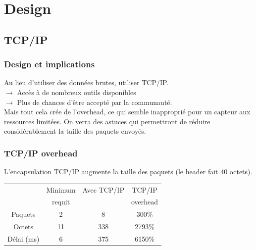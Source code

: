 \section{Design}
\subsection{TCP/IP}
\begin{frame}
 \frametitle{Design et implications}
 Au lieu d'utiliser des données brutes, utiliser TCP/IP.\\
 \vspace{5mm}
 \textbf{$\rightarrow$} Accès à de nombreux outils disponibles \\
 \textbf{$\rightarrow$} Plus de chances d'être accepté par la communauté.\\
 \vspace{5mm}
 Mais tout cela crée de l'overhead, ce qui semble inapproprié pour un capteur aux ressources limitées. On verra des astuces qui permettront de réduire considérablement la taille des paquets envoyés.
\end{frame}
\begin{frame}
\frametitle{TCP/IP overhead}
L'encapsulation TCP/IP augmente la taille des paquets (le header fait 40 octets).\\
\vspace{5mm}
\begin{center}
\begin{tabular}{|c|c|c|c|}
\hline
~ & Minimum & Avec TCP/IP & TCP/IP\\
~ & requit & ~ & overhead\\
\hline
Paquets & 2 & 8 & 300\% \\
Octets & 11 & 338 & 2793\% \\
Délai (ms) & 6 & 375 & 6150\% \\
\hline
\end{tabular}
\end{center}
\end{frame}
